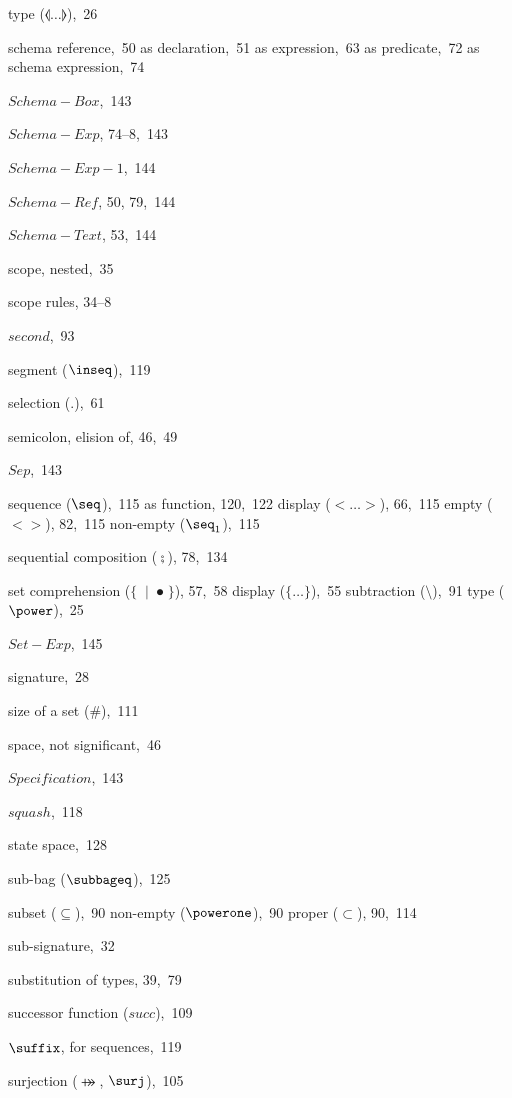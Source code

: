 \begin{theindex}
  \subitem type ($\lblot\ldots\rblot$),~26
\item schema reference,~50
  \subitem as declaration,~51
  \subitem as expression,~63
  \subitem as predicate,~72
  \subitem as schema expression,~74
\item \(Schema-Box\),~143
\item \(Schema-Exp\), 74--8,~143
\item \(Schema-Exp-1\),~144
\item \(Schema-Ref\), 50, 79,~144
\item \(Schema-Text\), 53,~144
\item scope, nested,~35
\item scope rules, 34--8
\item $second$,~93
\item segment ($\inseq$),~119
\item selection ($.$),~61
\item semicolon, elision of, 46,~49
\item \(Sep\),~143
\item sequence ($\seq$),~115
  \subitem as function, 120,~122
  \subitem display ($<\ldots>$), 66,~115
  \subitem empty ($<>$), 82,~115
  \subitem non-empty ($\seq_1$),~115
\item sequential composition ($\semi$), 78,~134
\item set
  \subitem comprehension ($\{\;\mid\;\spot\;\}$), 57,~58
  \subitem display ($\{\ldots\}$),~55
  \subitem subtraction ($\setminus$),~91
  \subitem type ($\power$),~25
\item \(Set-Exp\),~145
\item signature,~28
\item size of a set ($\#$),~111
\item space, not significant,~46
\item \(Specification\),~143
\item $squash$,~118
\item state space,~128
\item sub-bag ($\subbageq$),~125
\item subset ($\subseteq$),~90
  \subitem non-empty ($\powerone$),~90
  \subitem proper ($\subset$), 90,~114
\item sub-signature,~32
\item substitution of types, 39,~79
\item successor function ($succ$),~109
\item $\suffix$, for sequences,~119
\item surjection ($\psurj$, $\surj$),~105

\end{theindex}
